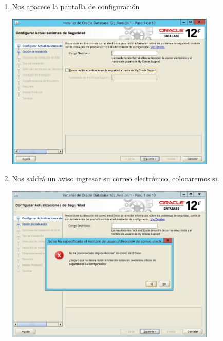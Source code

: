 \begin{enumerate}[1.]
	\hfill \break
	\hfill \break
	\hfill \break
	\hfill \break
	\hfill \break
	\item Nos aparece la pantalla de configuraci\'on \\
	\begin{center}
	\includegraphics[width=10cm]{./Imagenes/img12} 
	\end{center}

	\item Nos saldr\'a un aviso ingresar su correo electr\'onico, colocaremos si.\\
	\begin{center}
	\includegraphics[width=10cm]{./Imagenes/img13} 
	\end{center}


\end{enumerate}
